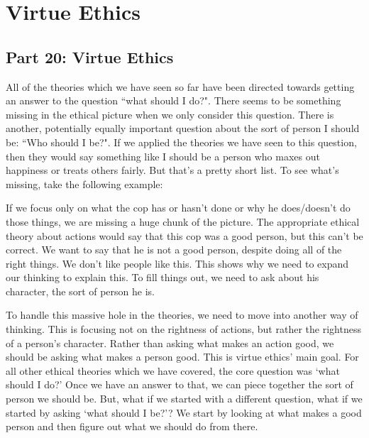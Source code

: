 \part{Virtue Ethics}
\label{ch.mod7}
\chapter{Part 20: Virtue Ethics}

All of the theories which we have seen so far have been directed towards getting an answer to the question ``what should I do?". There seems to be something missing in the ethical picture when we only consider this question. There is another, potentially equally important question about the sort of person I should be: ``Who should I be?". If we applied the theories we have seen to this question, then they would say something like I should be a person who maxes out happiness or treats others fairly. But that’s a pretty short list. To see what’s missing, take the following example:


If we focus only on what the cop has or hasn’t done or why he does/doesn’t do those things, we are missing a huge chunk of the picture. The appropriate ethical theory about actions would say that this cop was a good person, but this can't be correct.  We want to say that he is not a good person, despite doing all of the right things. We don’t like people like this. This shows why we need to expand our thinking to explain this. To fill things out, we need to ask about his character, the sort of person he is.

To handle this massive hole in the theories, we need to move into another way of thinking. This is focusing not on the rightness of actions, but rather the rightness of a person’s character. Rather than asking what makes an action good, we should be asking what makes a person good. This is virtue ethics’ main goal. For all other ethical theories which we have covered, the core question was ‘what should I do?’ Once we have an answer to that, we can piece together the sort of person we should be. But, what if we started with a different question, what if we started by asking ‘what should I be?’? We start by looking at what makes a good person and then figure out what we should do from there.

